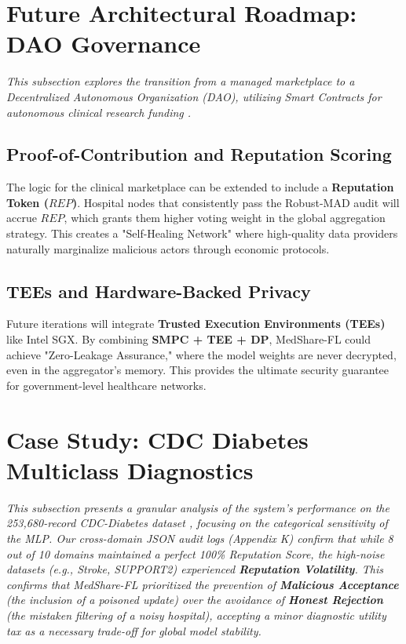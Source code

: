 \documentclass[10pt, a4paper, twocolumn]{article}
\begin{document}
\section{Future Architectural Roadmap: DAO Governance}

\textit{This subsection explores the transition from a managed marketplace to a Decentralized Autonomous Organization (DAO), utilizing Smart Contracts for autonomous clinical research funding \cite{kairouz2021}.}

\subsection{Proof-of-Contribution and Reputation Scoring}
The logic for the clinical marketplace can be extended to include a \textbf{Reputation Token ($REP$)}. Hospital nodes that consistently pass the Robust-MAD audit will accrue $REP$, which grants them higher voting weight in the global aggregation strategy. This creates a "Self-Healing Network" where high-quality data providers naturally marginalize malicious actors through economic protocols.

\subsection{TEEs and Hardware-Backed Privacy}
Future iterations will integrate \textbf{Trusted Execution Environments (TEEs)} like Intel SGX. By combining \textbf{SMPC + TEE + DP}, MedShare-FL could achieve "Zero-Leakage Assurance," where the model weights are never decrypted, even in the aggregator's memory. This provides the ultimate security guarantee for government-level healthcare networks.

\section{Case Study: CDC Diabetes Multiclass Diagnostics}

\textit{This subsection presents a granular analysis of the system's performance on the 253,680-record CDC-Diabetes dataset \cite{cdc2015}, focusing on the categorical sensitivity of the MLP. Our cross-domain JSON audit logs (Appendix K) confirm that while 8 out of 10 domains maintained a perfect 100\% Reputation Score, the high-noise datasets (e.g., Stroke, SUPPORT2) experienced \textbf{Reputation Volatility}. This confirms that MedShare-FL prioritized the prevention of \textbf{Malicious Acceptance} (the inclusion of a poisoned update) over the avoidance of \textbf{Honest Rejection} (the mistaken filtering of a noisy hospital), accepting a minor diagnostic utility tax as a necessary trade-off for global model stability.}
\end{document}
